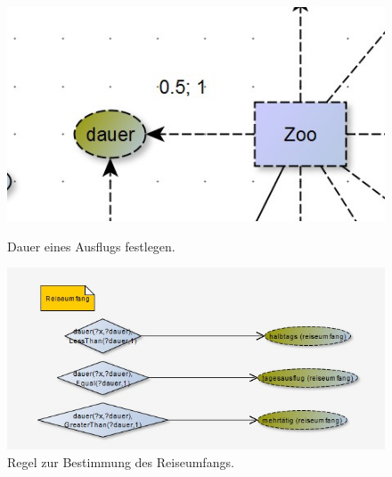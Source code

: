     \begin{figure}[H]%
        \begin{minipage}[hbt]{0,49\textwidth}
            \centering
            \includegraphics[scale=0.3]{bilder/dauer.jpg}
            \caption*{Dauer eines Ausflugs festlegen.\label{fig:dauer}\protect\footnotemark[5]}
        \end{minipage}
        \begin{minipage}[hbt]{0,49\textwidth}
            \centering
            \includegraphics[scale=0.3]{bilder/reiseUmfang.jpg}
            \caption*{Regel zur Bestimmung des Reiseumfangs.\label{fig:reiseumfang}\protect\footnotemark[5]}
        \end{minipage}
    \end{figure}

